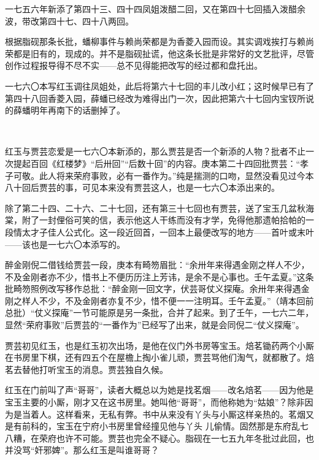 \par 一七五六年新添了第四十三、四十四凤姐泼醋二回，又在第四十七回插入泼醋余波，带改第四十七、四十八两回。
\par 根据脂砚那条长批，蟠柳事件与赖尚荣都是为香菱入园而设。其实调戏挨打与赖尚荣都是旧有的，现成的。并不是脂砚扯谎，他这条长批是非常好的文艺批评，尽管创作过程报导得不尽不实——总不见得能把改写的经过都和盘托出。
\par 一七六〇本写红玉调往凤姐处，此后将第六十七回的丰儿改小红；这时候早已有了第四十八回香菱入园，薛蟠已经改为难得出门一次，因此把第六十七回内宝钗所说的薛蟠明年再南下的话删掉了。
\par  
\par 红玉与贾芸恋爱是一七六〇本新添的，那么贾芸是否一个新添的人物？批者不止一次提起百回《红楼梦》“后卅回”“后数十回”的内容。庚本第二十四回批贾芸：“孝子可敬。此人将来荣府事败，必有一番作为。”纯是揣测的口吻，显然没看见过今本八十回后贾芸的事，可见本来没有贾芸这人，也是一七六〇本添出来的。
\par 除了第二十四、二十六、二十七回，还有第三十七回也有贾芸，送了宝玉几盆秋海棠，附了一封俚俗可笑的信，表示他这人干练而没有才学，免得他那遗帕拾帕的一段情太才子佳人公式化。这一段近回首，一回本上最便改写的地方——首叶或末叶——该也是一七六〇本添写的。
\par 醉金刚倪二借钱给贾芸一段，庚本有畸笏眉批：“余卅年来得遇金刚之样人不少，不及金刚者亦不少，惜书上不便历历注上芳讳，是余不是心事也。壬午孟夏。”这条批畸笏照例改写移作总批：“醉金刚一回文字，伏芸哥仗义探庵。余卅年来得遇金刚之样人不少，不及金刚者亦复不少，惜不便一一注明耳。壬午孟夏。”（靖本回前总批）“仗义探庵”一节可能原是另一条批，合并了起来。到了壬午，一七六二年，显然“荣府事败”后贾芸的“一番作为”已经写了出来，就是会同倪二“仗义探庵”。
\par 贾芸初见红玉，也是红玉初次出场，是他在仪门外书房等宝玉。焙茗锄药两个小厮在书房里下棋，还有四五个在屋檐上掏小雀儿顽，贾芸骂他们淘气，就都散了。焙茗去替他打听宝玉的消息。贾芸独自久候。
\par 红玉在门前叫了声“哥哥”，读者大概总以为她是找茗烟——改名焙茗——因为他是宝玉主要的小厮，刚才又在这书房里。她叫他“哥哥”，而他称她为“姑娘”？除非因为是当着人。这样看来，无私有弊。书中从来没有丫头与小厮这样亲热的。茗烟又是有前科的，宝玉在宁府小书房里曾经撞见他与丫头 儿偷情。固然那是东府乱七八糟，在荣府也许不可能。贾芸也完全不疑心。脂砚在一七五九年冬批过此回，也并没骂“奸邪婢”。那么红玉是叫谁哥哥？
